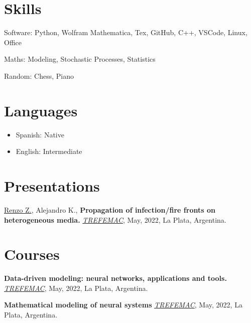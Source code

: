 \documentclass[a4paper,10pt]{article}
\begin{document}
\begin{adjustbox}{valign=t}
\begin{minipage}{0.5\textwidth}
\begin{description}
\end{description}

\vspace*{-.6cm}
\section*{Skills}
\begin{description}
    \item Software: Python, Wolfram Mathematica, Tex, GitHub, C++, VSCode, Linux, Office
    \item Maths: Modeling, Stochastic Processes, Statistics
    \item Random: Chess, Piano
\end{description}
\vspace*{-.6cm}
\section*{Languages}
\begin{itemize}
	\raggedright
	\item Spanish: Native
	\item English: Intermediate
\end{itemize}

\vspace*{-.6cm}
\section*{Presentations}
\begin{description}
	\raggedright
	\item \underline{Renzo Z.}, Alejandro K., \textbf{Propagation of infection/fire fronts on heterogeneous media.} 
    {\href{https://sites.google.com/view/trefemac2022}{\it TREFEMAC}}, May, 2022, La Plata, Argentina. 

\end{description}
\vspace*{-.6cm}
\section*{Courses}
\begin{description}
    \raggedright
    \item \textbf{Data-driven modeling: neural networks, applications and tools.} {\href{https://sites.google.com/view/trefemac2022}{\it TREFEMAC}}, May, 2022, La Plata, Argentina.
    \item \textbf{Mathematical modeling of neural systems} {\href{https://sites.google.com/view/trefemac2022}{\it TREFEMAC}}, May, 2022, La Plata, Argentina.
\end{description}


\end{minipage}
\end{adjustbox}
\end{document}
